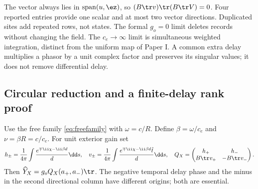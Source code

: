 The vector always lies in $\operatorname{span}(u,\ez)$, so $(B\tr v)\tr(B\tr V)=0$. Four reported entries provide one scalar and at most two vector directions. Duplicated sites add repeated rows, not states. The formal $g_o=0$ limit deletes records without changing the field. The $c_e\to\infty$ limit is simultaneous weighted integration, distinct from the uniform map of Paper I. A common extra delay multiplies a phasor by a unit complex factor and preserves its singular values; it does not remove differential delay.

\subsection{Circular reduction and a finite-delay rank proof}
Use the free family \eqref{eq:freefamily} with $\omega=c/R$. Define $\beta=\omega/c_e$ and $\nu=\beta R=c/c_e$. For unit exterior gain set
\begin{equation}\label{eq:Q}
 h_\pm=\frac1{4\pi}\int\frac{e^{\mp\ii\chi-\ii\beta d}}d\dd s,\quad
 v_\pm=\frac1{4\pi}\int\frac{e^{\mp\ii\chi-\ii\beta d}\hat t}d\dd s,
 \quad Q_X=\begin{pmatrix}h_+&h_-\\B\tr v_+&-B\tr v_-\end{pmatrix}.
\end{equation}
Then $\widehat Y_X=g_oQ_X(a_+,a_-)\tr$. The negative temporal delay phase and the minus in the second directional column have different origins; both are essential.

